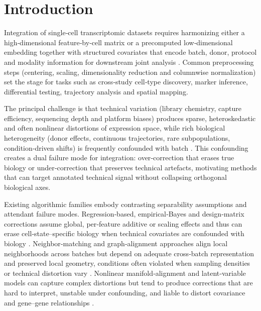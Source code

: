 \documentclass{article}
\begin{document}
\section{Introduction}

Integration of single‑cell transcriptomic datasets requires harmonizing either a high‑dimensional feature‑by‑cell matrix or a precomputed low‑dimensional embedding together with structured covariates that encode batch, donor, protocol and modality information for downstream joint analysis \citep{Liu2021RobustIO,Korsunsky2019FastSA}. Common preprocessing steps (centering, scaling, dimensionality reduction and columnwise normalization) set the stage for tasks such as cross‑study cell‑type discovery, marker inference, differential testing, trajectory analysis and spatial mapping.

The principal challenge is that technical variation (library chemistry, capture efficiency, sequencing depth and platform biases) produces sparse, heteroskedastic and often nonlinear distortions of expression space, while rich biological heterogeneity (donor effects, continuous trajectories, rare subpopulations, condition‑driven shifts) is frequently confounded with batch \citep{Svensson2017ExponentialSO,Hie2019EfficientIO,Grn2016DeNP,Richards2021ACO}. This confounding creates a dual failure mode for integration: over‑correction that erases true biology or under‑correction that preserves technical artefacts, motivating methods that can target annotated technical signal without collapsing orthogonal biological axes.

Existing algorithmic families embody contrasting separability assumptions and attendant failure modes. Regression‑based, empirical‑Bayes and design‑matrix corrections assume global, per‑feature additive or scaling effects and thus can erase cell‑state–specific biology when technical covariates are confounded with biology \citep{Li2022FastIntegrationAV,Lee2023BenchmarkingAF}. Neighbor‑matching and graph‑alignment approaches align local neighborhoods across batches but depend on adequate cross‑batch representation and preserved local geometry, conditions often violated when sampling densities or technical distortion vary \citep{Polaski2019BBKNNFB,Zhou2023AccurateIO}. Nonlinear manifold‑alignment and latent‑variable models can capture complex distortions but tend to produce corrections that are hard to interpret, unstable under confounding, and liable to distort covariance and gene–gene relationships \citep{McInnes2018UMAPUM,Xiong2021ConstructionOC,Stegle2012UsingPE,Xu2023MASIEF}.
\end{document}
